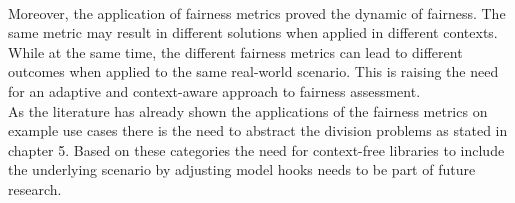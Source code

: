 \documentclass[german, a4paper, 11pt, oneside]{scrbook}
\begin{document}
\\Moreover, the application of fairness metrics proved the dynamic of fairness. The same metric may result in different solutions when applied in different contexts. While at the same time, the different fairness metrics can lead to different outcomes when applied to the same real-world scenario. This is raising the need for an adaptive and context-aware approach to fairness assessment. \\As the literature has already shown the applications of the fairness metrics on example use cases there is the need to abstract the division problems as stated in chapter 5. Based on these categories the need for context-free libraries to include the underlying scenario by adjusting model hooks needs to be part of future research. 
\newpage

\end{document}
